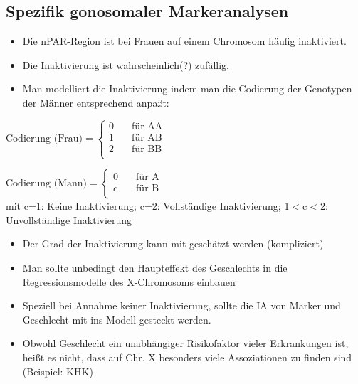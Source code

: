 \subsection{Spezifik gonosomaler Markeranalysen}
\begin{itemize}
	\item Die nPAR-Region ist bei Frauen auf einem Chromosom häufig inaktiviert.
	\item Die Inaktivierung ist wahrscheinlich(?) zufällig.
	\item Man modelliert die Inaktivierung indem man die Codierung der Genotypen der Männer entsprechend anpaßt:
\end{itemize}
$
\text{Codierung (Frau)} =
  \begin{cases}
    0  & \quad \text{für AA}\\
    1  & \quad \text{für AB}\\
    2  & \quad \text{für BB}\\
  \end{cases}
$

$
\text{Codierung (Mann)} =
  \begin{cases}
    0  & \quad \text{für A}\\
    c  & \quad \text{für B}\\
  \end{cases}
$\\
mit c=1: Keine Inaktivierung; c=2: Vollständige Inaktivierung; 1$<$c$<$2: Unvollständige Inaktivierung

\begin{itemize}
	\item Der Grad der Inaktivierung kann mit geschätzt werden (kompliziert)
	\item Man sollte unbedingt den Haupteffekt des Geschlechts in die Regressionsmodelle des X-Chromosoms einbauen
	\item Speziell bei Annahme keiner Inaktivierung, sollte die IA von Marker und Geschlecht mit ins Modell gesteckt werden.
	\item Obwohl Geschlecht ein unabhängiger Risikofaktor vieler Erkrankungen ist, heißt es nicht, dass auf Chr. X besonders viele Assoziationen zu finden sind (Beispiel: KHK)
\end{itemize}

